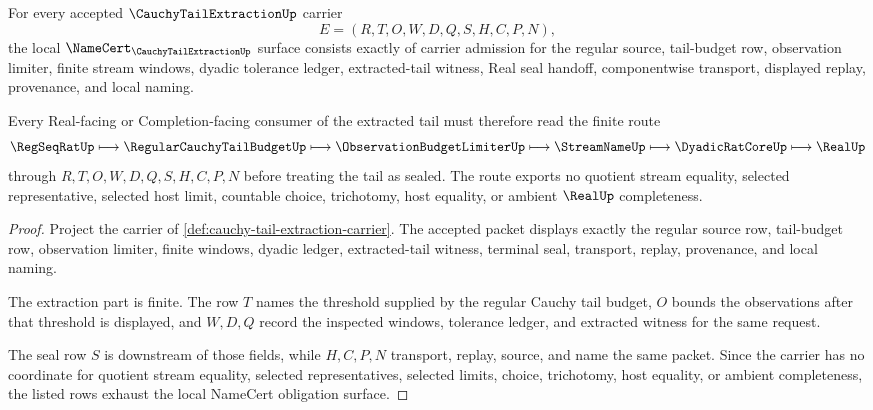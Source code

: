 \begin{theorem}
\label{thm:cauchy-tail-extraction-namecert-obligations}
For every accepted $\CauchyTailExtractionUp$ carrier
$$
E=(R,T,O,W,D,Q,S,H,C,P,N),
$$
the local $\NameCert_{\CauchyTailExtractionUp}$ surface consists exactly of carrier admission for the regular source, tail-budget row, observation limiter, finite stream windows, dyadic tolerance ledger, extracted-tail witness, Real seal handoff, componentwise transport, displayed replay, provenance, and local naming.

Every Real-facing or Completion-facing consumer of the extracted tail must therefore read the finite route
$$
\RegSeqRatUp \longmapsto \RegularCauchyTailBudgetUp \longmapsto \ObservationBudgetLimiterUp \longmapsto \StreamNameUp \longmapsto \DyadicRatCoreUp \longmapsto \RealUp
$$
through $R,T,O,W,D,Q,S,H,C,P,N$ before treating the tail as sealed. The route exports no quotient stream equality, selected representative, selected host limit, countable choice, trichotomy, host equality, or ambient $\RealUp$ completeness.
\end{theorem}
\begin{proof}
Project the carrier of \autoref{def:cauchy-tail-extraction-carrier}. The accepted packet displays exactly the regular source row, tail-budget row, observation limiter, finite windows, dyadic ledger, extracted-tail witness, terminal seal, transport, replay, provenance, and local naming.

The extraction part is finite. The row $T$ names the threshold supplied by the regular Cauchy tail budget, $O$ bounds the observations after that threshold is displayed, and $W,D,Q$ record the inspected windows, tolerance ledger, and extracted witness for the same request.

The seal row $S$ is downstream of those fields, while $H,C,P,N$ transport, replay, source, and name the same packet. Since the carrier has no coordinate for quotient stream equality, selected representatives, selected limits, choice, trichotomy, host equality, or ambient completeness, the listed rows exhaust the local NameCert obligation surface.
\end{proof}



